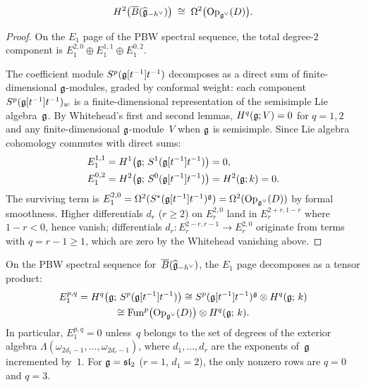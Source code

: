 \begin{proposition}
\label{prop:oper-bar-h2-dl}
\begin{equation}\label{eq:h2-oper}
H^2\bigl(\overline{B}(\widehat{\mathfrak{g}}_{-h^\vee})\bigr)
\;\cong\;
\Omega^2\bigl(\mathrm{Op}_{\mathfrak{g}^\vee}(D)\bigr).
\end{equation}
\end{proposition}

\begin{proof}
On the $E_1$ page of the PBW spectral sequence, the total
degree-$2$ component is
$E_1^{2,0} \oplus E_1^{1,1} \oplus E_1^{0,2}$.

The coefficient module $S^p(\mathfrak{g}[t^{-1}]t^{-1})$ decomposes as a
direct sum of finite-dimensional $\mathfrak{g}$-modules, graded by conformal
weight: each component
$S^p(\mathfrak{g}[t^{-1}]t^{-1})_w$ is a finite-dimensional representation
of the semisimple Lie algebra~$\mathfrak{g}$.  By Whitehead's first and
second lemmas, $H^q(\mathfrak{g}; V) = 0$ for $q = 1, 2$ and any
finite-dimensional $\mathfrak{g}$-module~$V$ when $\mathfrak{g}$ is semisimple.
Since Lie algebra cohomology commutes with direct sums:
\begin{align*}
E_1^{1,1} &= H^1\bigl(\mathfrak{g};\, S^1(\mathfrak{g}[t^{-1}]t^{-1})\bigr) = 0, \\
E_1^{0,2} &= H^2\bigl(\mathfrak{g};\, S^0(\mathfrak{g}[t^{-1}]t^{-1})\bigr)
           = H^2(\mathfrak{g}; k) = 0.
\end{align*}
The surviving term is $E_1^{2,0} = \Omega^2(S^*(\mathfrak{g}[t^{-1}]t^{-1})^{\mathfrak{g}})
= \Omega^2(\mathrm{Op}_{\mathfrak{g}^\vee}(D))$ by formal smoothness.
Higher differentials $d_r$ ($r \geq 2$) on $E_r^{2,0}$ land in
$E_r^{2+r, 1-r}$ where $1 - r < 0$, hence vanish; differentials
$d_r\colon E_r^{2-r, r-1} \to E_r^{2,0}$ originate from terms with
$q = r - 1 \geq 1$, which are zero by the Whitehead vanishing above.
\end{proof}

\begin{proposition}
\label{prop:whitehead-spectral-decomposition}
On the PBW spectral sequence for~$\overline{B}(\widehat{\mathfrak{g}}_{-h^\vee})$,
the $E_1$ page decomposes as a tensor product:
\begin{multline}\label{eq:whitehead-spectral-decomposition}
E_1^{p,q}
= H^q\bigl(\mathfrak{g};\, S^p(\mathfrak{g}[t^{-1}]t^{-1})\bigr)
\cong
S^p(\mathfrak{g}[t^{-1}]t^{-1})^{\mathfrak{g}}
\otimes
H^q(\mathfrak{g};\, k)\\
\cong
\mathrm{Fun}^p\bigl(\mathrm{Op}_{\mathfrak{g}^\vee}(D)\bigr)
\otimes H^q(\mathfrak{g};\, k).
\end{multline}
In particular, $E_1^{p,q} = 0$ unless~$q$ belongs to the
set of degrees of the exterior algebra
$\Lambda(\omega_{2d_1-1},\allowbreak \ldots,\allowbreak \omega_{2d_r-1})$,
where $d_1, \ldots, d_r$ are the exponents of~$\mathfrak{g}$
incremented by~$1$.  For
$\mathfrak{g} = \mathfrak{sl}_2$ ($r = 1$, $d_1 = 2$),
the only nonzero rows are $q = 0$ and $q = 3$.
\end{proposition}

